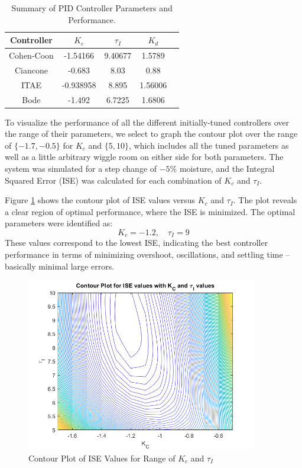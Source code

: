 \documentclass[12pt]{article}
\begin{document}
\begin{enumerate}
\begin{enumerate}
    \begin{table}[H]
      \centering
      \begin{tabular}{|c|c|c|c|c|}
          \hline
          \textbf{Controller} & \textbf{\( K_c \)} & \textbf{\( \tau_I \) } & \textbf{\( K_d \) } \\
          \hline
          Cohen-Coon & -1.54166 & 9.40677 & 1.5789 \\
          \hline
          Ciancone & -0.683 & 8.03 & 0.88 \\
          \hline
          ITAE & -0.938958 & 8.895 & 1.56006 \\
          \hline
          Bode & -1.492 & 6.7225 & 1.6806 \\
          \hline
      \end{tabular}
      \caption{Summary of PID Controller Parameters and Performance.}
      \label{tab:table2-4a}
    \end{table}

    To visualize the performance of all the different initially-tuned controllers over the range of their parameters, we select to graph the contour plot over the range of $\{-1.7, -0.5\}$ for $K_c$ and $\{5, 10\}$, which includes all the tuned parameters as well as a little arbitrary wiggle room on either side for both parameters. The system was simulated for a step change of \(-5\%\) moisture, and the Integral Squared Error (ISE) was calculated for each combination of \( K_c \) and \( \tau_I \).

    Figure \ref{fig:figure2_4a} shows the contour plot of ISE values versus \( K_c \) and \( \tau_I \). The plot reveals a clear region of optimal performance, where the ISE is minimized. The optimal parameters were identified as:
    \[
    K_c = -1.2, \quad \tau_I = 9
    \]
    These values correspond to the lowest ISE, indicating the best controller performance in terms of minimizing overshoot, oscillations, and settling time -- basically minimal large errors.

    \begin{figure}[H]
      \centering
      \includegraphics[width=0.9\textwidth]{Figures/figure2-4a.png}
      \caption{Contour Plot of ISE Values for Range of \( K_c \) and \( \tau_I \)}
      \label{fig:figure2_4a}
    \end{figure}


\end{enumerate}
\end{enumerate}
\end{document}
